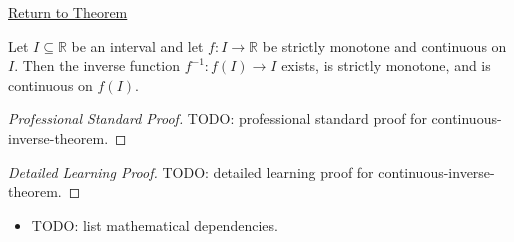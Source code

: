 \newpage
{}
\label{prf:continuous-inverse-theorem}

\begin{remark*}[Return]
\hyperref[thm:continuous-inverse-theorem]{Return to Theorem}
\end{remark*}

\begin{theorem*}
Let $I\subseteq\mathbb{R}$ be an interval and let $f:I\to\mathbb{R}$ be strictly monotone and continuous on $I$. Then the inverse function $f^{-1}:f(I)\to I$ exists, is strictly monotone, and is continuous on $f(I)$.
\end{theorem*}

\begin{proof}[Professional Standard Proof]
\LRAProofBodyStart
TODO: professional standard proof for continuous-inverse-theorem.
\end{proof}

\begin{proof}[Detailed Learning Proof]
\LRAProofBodyStart
TODO: detailed learning proof for continuous-inverse-theorem.
\end{proof}

\begin{remark*}
\end{remark*}

\begin{dependencies}
\begin{itemize}
  \item TODO: list mathematical dependencies.
\end{itemize}
\end{dependencies}

\clearpage
